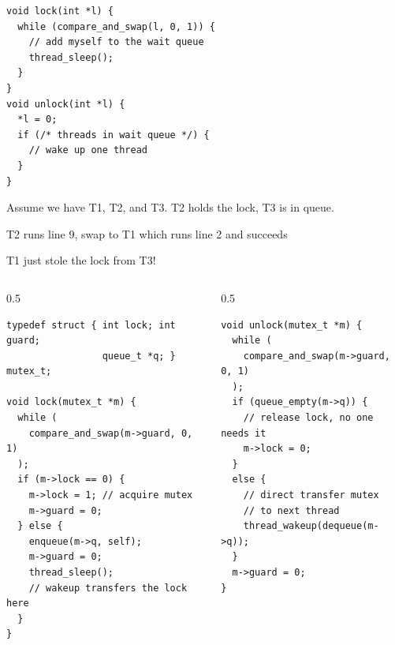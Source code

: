   \begin{slide}


    \begin{verbatim}
void lock(int *l) {
  while (compare_and_swap(l, 0, 1)) {
    // add myself to the wait queue
    thread_sleep();
  }
}
void unlock(int *l) {
  *l = 0;
  if (/* threads in wait queue */) {
    // wake up one thread
  }
}
    \end{verbatim}
    \medskip

    Assume we have T1, T2, and T3. T2 holds the lock, T3 is in queue.

    \leftspace{}T2 runs line 9, swap to T1 which runs line 2 and succeeds

    \leftspace{}\leftspace{}T1 just stole the lock from T3!
  \end{slide}

  \begin{slide}


    \begin{columns}
      \begin{column}{0.5\textwidth}
        \begin{verbatim}
typedef struct { int lock; int guard;
                 queue_t *q; } mutex_t;

void lock(mutex_t *m) {
  while (
    compare_and_swap(m->guard, 0, 1)
  );
  if (m->lock == 0) {
    m->lock = 1; // acquire mutex
    m->guard = 0;
  } else {
    enqueue(m->q, self);
    m->guard = 0;
    thread_sleep();
    // wakeup transfers the lock here
  }
}
        \end{verbatim}
      \end{column}
      \begin{column}{0.5\textwidth}
        \begin{verbatim}
void unlock(mutex_t *m) {
  while (
    compare_and_swap(m->guard, 0, 1)
  );
  if (queue_empty(m->q)) {
    // release lock, no one needs it
    m->lock = 0; 
  }
  else {
    // direct transfer mutex
    // to next thread
    thread_wakeup(dequeue(m->q));
  }
  m->guard = 0;
}
        \end{verbatim}
      \end{column}
    \end{columns}

  \end{slide}

